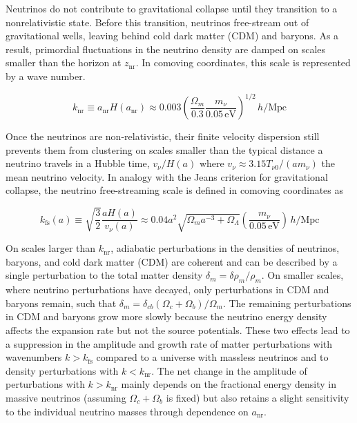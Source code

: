 Neutrinos do not contribute to gravitational collapse until they transition to a nonrelativistic state. Before this transition, neutrinos free-stream out of gravitational wells, leaving behind cold dark matter (CDM) and baryons. As a result, primordial fluctuations in the neutrino density are damped on scales smaller than the horizon at $z_{\mathrm{nr}}$. In comoving coordinates, this scale is represented by a wave number.

\begin{equation}
    k_{\mathrm{nr}} \equiv a_{\mathrm{nr}} H\left(a_{\mathrm{nr}}\right) \approx 0.003 \left(\frac{\Omega_{m}}{0.3} \frac{m_{\nu}}{0.05 \, \mathrm{eV}}\right)^{1 / 2} \, h / \mathrm{Mpc}
\label{n.8}
\end{equation}

Once the neutrinos are non-relativistic, their finite velocity dispersion still prevents them from clustering on scales smaller than the typical distance a neutrino travels in a Hubble time, $v_{\nu} / H(a)$ where $v_{\nu} \approx 3.15 T_{\nu 0} /\left(a m_{\nu}\right)$ the mean neutrino velocity. In analogy with the Jeans criterion for gravitational collapse, the neutrino free-streaming scale is defined in comoving coordinates as

\begin{equation}
    k_{\mathrm{fs}}(a) \equiv \sqrt{\frac{3}{2}} \frac{a H(a)}{v_{\nu}(a)} \approx 0.04 a^{2} \sqrt{\Omega_{m} a^{-3} + \Omega_{\Lambda}}\left(\frac{m_{\nu}}{0.05 \, \mathrm{eV}}\right) \, h / \mathrm{Mpc}
    \label{n.9}
\end{equation}

On scales larger than $k_{\mathrm{nr}}$, adiabatic perturbations in the densities of neutrinos, baryons, and cold dark matter (CDM) are coherent and can be described by a single perturbation to the total matter density $\delta_{m} = \delta \rho_{m} / \rho_{m}$. On smaller scales, where neutrino perturbations have decayed, only perturbations in CDM and baryons remain, such that $\delta_{m} = \delta_{cb} \left( \Omega_{c} + \Omega_{b} \right) / \Omega_{m}$. The remaining perturbations in CDM and baryons grow more slowly because the neutrino energy density affects the expansion rate but not the source potentials. These two effects lead to a suppression in the amplitude and growth rate of matter perturbations with wavenumbers $k > k_{\mathrm{fs}}$ compared to a universe with massless neutrinos and to density perturbations with $k < k_{\mathrm{nr}}$. The net change in the amplitude of perturbations with $k > k_{\mathrm{nr}}$ mainly depends on the fractional energy density in massive neutrinos (assuming $\Omega_{c} + \Omega_{b}$ is fixed) but also retains a slight sensitivity to the individual neutrino masses through dependence on $a_{\mathrm{nr}}$.

